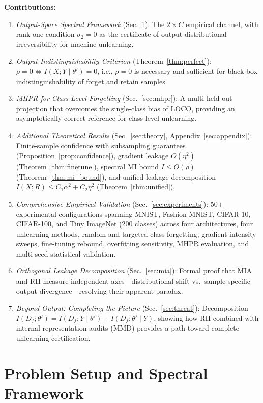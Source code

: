 \documentclass[journal]{IEEEtran}
\theoremstyle{definition}
\begin{document}
\textbf{Contributions:}
\begin{enumerate}
\item \emph{Output-Space Spectral Framework} (Sec.~\ref{sec:channel}): The $2\times C$ empirical channel, with rank-one condition $\sigma_2=0$ as the certificate of output distributional irreversibility for machine unlearning.
\item \emph{Output Indistinguishability Criterion} (Theorem~\ref{thm:perfect}): $\rho=0 \iff I(X;Y\mid\theta')=0$, i.e., $\rho=0$ is necessary and sufficient for black-box indistinguishability of forget and retain samples.
\item \emph{MHPR for Class-Level Forgetting} (Sec.~\ref{sec:mhpr}): A multi-held-out projection that overcomes the single-class bias of LOCO, providing an asymptotically correct reference for class-level unlearning.
\item \emph{Additional Theoretical Results} (Sec.~\ref{sec:theory}, Appendix~\ref{sec:appendix}): Finite-sample confidence with subsampling guarantees (Proposition~\ref{prop:confidence}), gradient leakage $O(\eta^2)$ (Theorem~\ref{thm:finetune}), spectral MI bound $I \le O(\rho)$ (Theorem~\ref{thm:mi_bound}), and unified leakage decomposition $I(X;R) \le C_1\alpha^2 + C_2\eta^2$ (Theorem~\ref{thm:unified}).
\item \emph{Comprehensive Empirical Validation} (Sec.~\ref{sec:experiments}): 50+ experimental configurations spanning MNIST, Fashion-MNIST, CIFAR-10, CIFAR-100, and Tiny ImageNet (200 classes) across four architectures, four unlearning methods, random and targeted class forgetting, gradient intensity sweeps, fine-tuning rebound, overfitting sensitivity, MHPR evaluation, and multi-seed statistical validation.
\item \emph{Orthogonal Leakage Decomposition} (Sec.~\ref{sec:mia}): Formal proof that MIA and RII measure independent axes---distributional shift vs.\ sample-specific output divergence---resolving their apparent paradox.
\item \emph{Beyond Output: Completing the Picture} (Sec.~\ref{sec:threat}): Decomposition $I(D_f;\theta') = I(D_f;Y\mid\theta') + I(D_f;\theta'\mid Y)$, showing how RII combined with internal representation audits (MMD) provides a path toward complete unlearning certification.
\end{enumerate}

\section{Problem Setup and Spectral Framework}
\label{sec:channel}
\end{document}
